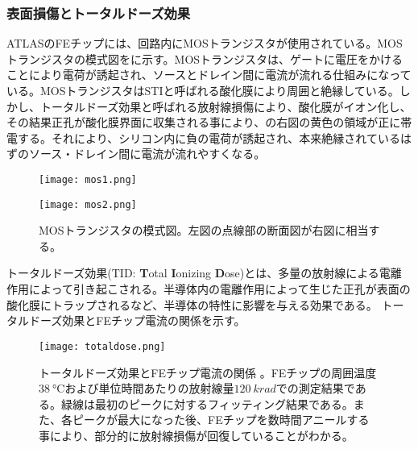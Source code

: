 \subsubsection{表面損傷とトータルドーズ効果}
\label{sec:totaldoze}

ATLASのFEチップには、回路内にMOSトランジスタが使用されている。MOSトランジスタの模式図をに示す。MOSトランジスタは、ゲートに電圧をかけることにより電荷が誘起され、ソースとドレイン間に電流が流れる仕組みになっている。MOSトランジスタはSTIと呼ばれる酸化膜により周囲と絶縁している。しかし、トータルドーズ効果と呼ばれる放射線損傷により、酸化膜がイオン化し、その結果正孔が酸化膜界面に収集される事により、の右図の黄色の領域が正に帯電する。それにより、シリコン内に負の電荷が誘起され、本来絶縁されているはずのソース・ドレイン間に電流が流れやすくなる。

\begin{figure}[tbp]
  \begin{minipage}[b]{0.5\linewidth}
    \centering
    \texttt{[image: mos1.png]}
  \end{minipage}
  \begin{minipage}[b]{0.5\linewidth}
    \centering
    \texttt{[image: mos2.png]}
  \end{minipage}
  \caption[MOSトランジスタの模式図]{MOSトランジスタの模式図。左図の点線部の断面図が右図に相当する。}
  \label{fig:mos}
\end{figure}

トータルドーズ効果(TID: \textbf{T}otal \textbf{I}onizing \textbf{D}ose)とは、多量の放射線による電離作用によって引き起こされる。半導体内の電離作用によって生じた正孔が表面の酸化膜にトラップされるなど、半導体の特性に影響を与える効果である。
トータルドーズ効果とFEチップ電流の関係を示す。

\begin{figure}[tbp]
  \centering
  \texttt{[image: totaldose.png]}
  \caption[トータルドーズ効果とFEチップ電流の関係]{トータルドーズ効果とFEチップ電流の関係 \cite{tid}。FEチップの周囲温度$38\ \si{\degreeCelsius}$および単位時間あたりの放射線量$120\ \si{krad}$での測定結果である。緑線は最初のピークに対するフィッティング結果である。また、各ピークが最大になった後、FEチップを数時間アニールする事により、部分的に放射線損傷が回復していることがわかる。}
  \label{fig:totaldoze}
\end{figure}

